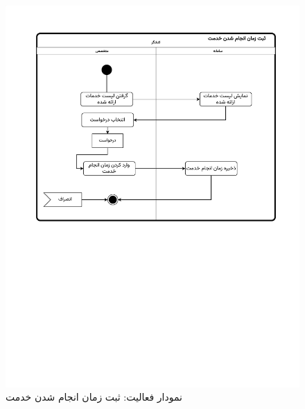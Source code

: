 \begin{figure}[ht!]
	\centering
	\includegraphics[scale=0.8, page=1]{figs/OOD-activity-reqtime.pdf}
	\caption{نمودار فعالیت: ثبت زمان انجام شدن خدمت}
\end{figure}
\FloatBarrier
\newpage

